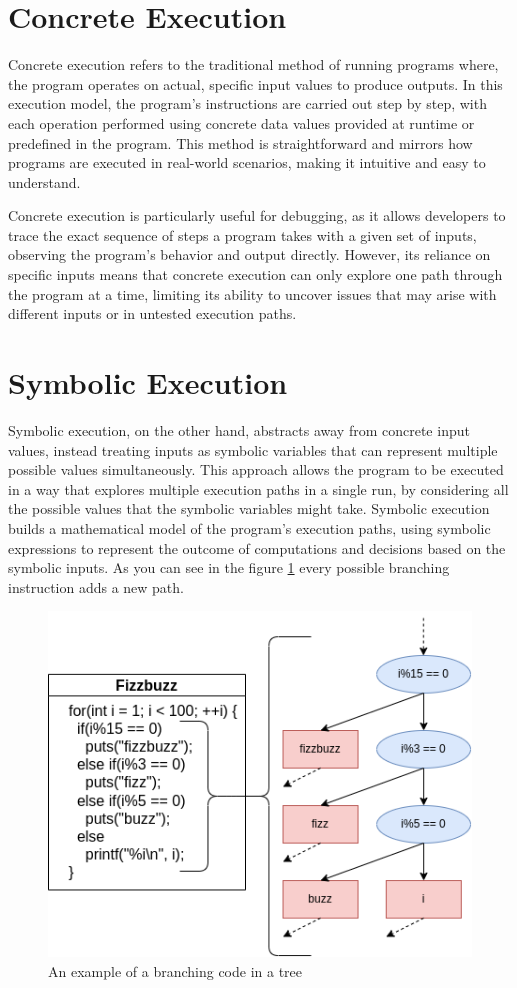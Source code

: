 \section{Concrete Execution}
Concrete execution refers to the traditional method of running programs where, the program operates on actual, specific input values to produce outputs.
In this execution model, the program's instructions are carried out step by step, with each operation performed using concrete data values provided at runtime or predefined in the program. 
This method is straightforward and mirrors how programs are executed in real-world scenarios, making it intuitive and easy to understand. 

Concrete execution is particularly useful for debugging, as it allows developers to trace the exact sequence of steps a program takes with a given set of inputs, observing the program's behavior and output directly.
However, its reliance on specific inputs means that concrete execution can only explore one path through the program at a time, limiting its ability to uncover issues that may arise with different inputs or in untested execution paths.

\section{Symbolic Execution}
Symbolic execution, on the other hand, abstracts away from concrete input values, instead treating inputs as symbolic variables that can represent multiple possible values simultaneously. 
This approach allows the program to be executed in a way that explores multiple execution paths in a single run, by considering all the possible values that the symbolic variables might take. 
Symbolic execution builds a mathematical model of the program's execution paths, using symbolic expressions to represent the outcome of computations and decisions based on the symbolic inputs. 
As you can see in the figure \ref{fig:sym_tree} every possible branching instruction adds a new path.
\begin{figure}[ht]
    \centering
    \includegraphics[width=0.8\linewidth]{figures/sym_trans}
    \caption[Branching in symbolic execution]{An example of a branching code in a tree}
    \label{fig:sym_tree}
\end{figure}

